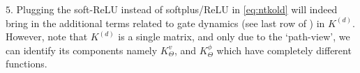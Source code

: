 $5.$ Plugging the soft-ReLU instead of softplus/ReLU in \eqref{eq:ntkold} will indeed bring in the additional terms related to gate dynamics (see last row of ) in $K^{(d)}$. However, note that $K^{(d)}$ is a single matrix, and only due to the `path-view', we can identify its components namely $K^v_{\Theta}$, and $K^{\phi}_{\Theta}$ which have completely different functions.
\FloatBarrier
\begin{table}[h]\centering
{}
\caption{Dynamics in various regimes. Here $p\in[P], s\in[n]$.}
\label{tb:dynamics}
\end{table}

